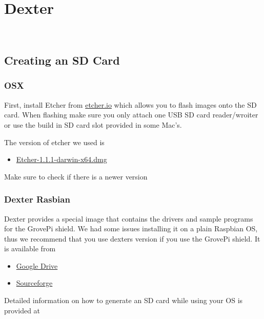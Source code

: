 

\chapter{Dexter}\label{dexter}

\FILENAME\

\section{Creating an SD Card}\label{creating-an-sd-card}

\subsection{OSX}\label{osx}

First, install Etcher from \href{https://etcher.io/}{etcher.io} which
allows you to flash images onto the SD card. When flashing make sure you
only attach one USB SD card reader/wroiter or use the build in SD card
slot provided in some Mac's.

The version of etcher we used is

\begin{itemize}
\item
  \href{https://github.com/resin-io/etcher/releases/download/v1.1.1/Etcher-1.1.1-darwin-x64.dmg}{Etcher-1.1.1-darwin-x64.dmg}
\end{itemize}

Make sure to check if there is a newer version

\subsection{Dexter Rasbian}\label{dexter-rasbian}

Dexter provides a special image that contains the drivers and sample
programs for the GrovePi shield. We had some issues installing it on a
plain Raspbian OS, thus we recommend that you use dexters version if you
use the GrovePi shield. It is available from

\begin{itemize}
\item
  \href{http://sourceforge.net/projects/dexterindustriesraspbianflavor/}{Google
  Drive}
\item
  \href{http://sourceforge.net/projects/dexterindustriesraspbianflavor/}{Sourceforge}
\end{itemize}

Detailed information on how to generate an SD card while using your OS
is provided at


